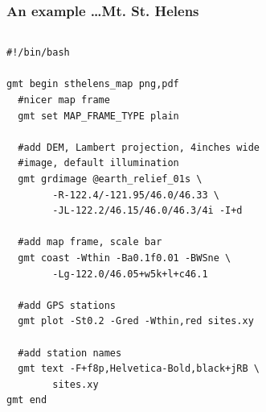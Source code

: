 \documentclass[unknownkeysallowed]{beamer}
\begin{document}
\begin{frame}[fragile=singleslide]
\frametitle{An example \dots Mt. St. Helens}
	\begin{columns}
		\tiny{
		\begin{verbatim}
#!/bin/bash

gmt begin sthelens_map png,pdf
  #nicer map frame
  gmt set MAP_FRAME_TYPE plain

  #add DEM, Lambert projection, 4inches wide 
  #image, default illumination
  gmt grdimage @earth_relief_01s \
        -R-122.4/-121.95/46.0/46.33 \
        -JL-122.2/46.15/46.0/46.3/4i -I+d

  #add map frame, scale bar
  gmt coast -Wthin -Ba0.1f0.01 -BWSne \
        -Lg-122.0/46.05+w5k+l+c46.1

  #add GPS stations
  gmt plot -St0.2 -Gred -Wthin,red sites.xy

  #add station names
  gmt text -F+f8p,Helvetica-Bold,black+jRB \
        sites.xy
gmt end		
		\end{verbatim}
}
		\begin{center}
		\end{center}
	\end{columns}
\end{frame}
\end{document}
